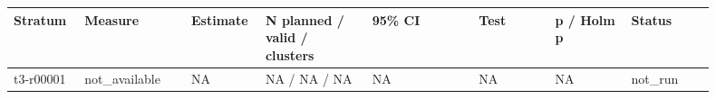 \begingroup
\small
\setlength{\tabcolsep}{2pt}
\begin{longtable}{@{}p{0.09\linewidth}p{0.14\linewidth}p{0.08\linewidth}p{0.14\linewidth}p{0.14\linewidth}p{0.1\linewidth}p{0.1\linewidth}p{0.11\linewidth}@{}}
\hline
Stratum & Measure & Estimate & N planned / valid / clusters & 95\% CI & Test & p / Holm p & Status \\
\hline
t3-r00001 & not\_\allowbreak{}available & NA & NA / NA / NA & NA & NA & NA & not\_\allowbreak{}run \\
\hline
\end{longtable}
\endgroup
